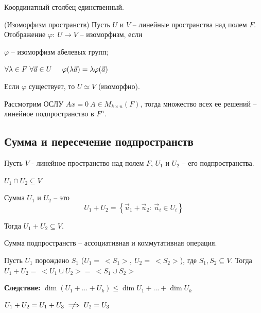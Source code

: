 \begin{multicols}{2}
\begin{note}{}{}
    Координатный столбец единственный.
\end{note} 
\begin{definition}{(Изоморфизм пространств)}{}
    Пусть $U$ и $V$ -- линейные пространства над полем $F$. Отображение $\varphi: \ U \to V$ -- изоморфизм, если
    \begin{enumerate*}
        \item $\varphi$ -- изоморфизм абелевых групп;
        \item $\forall \lambda \in F\ \forall \vec{a} \in U \hspace*{0.5cm} \varphi(\lambda \vec{a}) = \lambda\varphi(\vec{a})$
    \end{enumerate*}
    Если $\varphi$ существует, то $U \simeq V$ (изоморфно).
\end{definition}
Рассмотрим ОСЛУ $Ax=0 \ A\in M_{k\times n}(F)$, тогда множество всех ее решений -- линейное подпространство в $F^n$. 
\subsection*{Сумма и пересечение подпространств}
Пусть $V$ - линейное пространство над полем $F$, $U_1$ и $U_2$ -- его подпространства.\vspace*{0.3cm}
\begin{note}{}{}
    $U_1 \cap U_2 \subseteq V$
\end{note}
\begin{definition}{}{}
    Сумма $U_1$ и $U_2$ -- это
    \[
        U_1 + U_2 = \left\{\vec{u}_1 + \vec{u}_2: \ \vec{u}_i \in U_i\right\}
        \]
\end{definition}
Тогда $U_1 + U_2 \subseteq V$. \vspace*{0.3cm}
\begin{note}{}{}
    Сумма подпространств -- ассоциативная и коммутативная операция.
\end{note}
\begin{proposition}{}{}
    Пусть $U_1$ порождено $S_1$ ($U_1 =\ <S_1>, \ U_2 =\ <S_2>$), где $S_1, S_2 \subseteq V$. Тогда $U_1 + U_2 =\ <U_1 \cup U_2> =\ <S_1 \cup S_2>$ 
\end{proposition}
\textbf{Следствие:} $\dim (U_1 + \ldots + U_k) \leq \dim U_1 + \ldots + \dim U_k$ \vspace*{0.3cm}

\begin{note}{}{}
    $U_1 + U_2 = U_1 + U_3 \centernot\implies U_2 = U_3$
\end{note}


\end{multicols}
